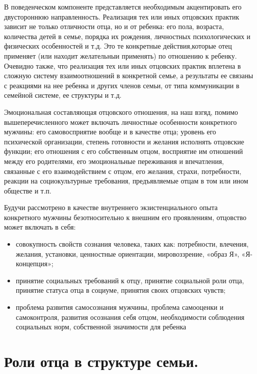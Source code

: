 \documentclass{../../common/thesisbyxetex}
\begin{document}
В поведенческом компоненте
представляется необходимым акцентировать его двустороннюю направленность. Реализация тех или иных
отцовских практик зависит не только отличности отца, но и от ребенка: его пола, возраста, количества
детей в семье, порядка их рождения, личностных психологических и физических особенностей и т.д.
Это те конкретные действия,которые отец применяет (или находит желательныи
применять) по отношению к ребенку. Очевидно также, что реализация тех или иных отцовских практик
вплетена в
сложную систему взаимоотношений в конкретной семье, а результаты ее связаны с реакциями на
нее ребенка и других членов семьи, от типа коммуникации в семейной системе, ее структуры и т.д.

Эмоциональная составляющая отцовского отношения, на наш взгяд, помимо вышеперечисленного может
включать личностные особенности конкретного мужчины: его самовосприятие вообще и в качестве отца;
уровень его психической организации, степень готовности и желания исполнять отцовские функции;
его отношения с его собственным отцом, восприятие им отношений между его родителями, его
эмоциональные переживания и впечатления, связанные с его взаимодействием с отцом, его желания,
страхи, потребности, реакции на социокультурные требования, предъявляемые отцам в том или ином
обществе и т.п.

Будучи рассмотрено в качестве внутреннего экзистенциального опыта
конкретного мужчины безотносительно к внешним его проявлениям, отцовство может включать в себя:

\begin{itemize}
	\item  совокупность свойств сознания человека, таких
как: потребности, влечения, желания, установки, ценностные ориентации,
мировоззрение, «образ Я», «Я-концепция»;

\item принятие социальных требований к отцу, принятие социальной роли отца, принятие статуса отца в
социуме, принятия своих отцовских чувств;

\item проблема развития самосознания мужчины, проблема самооценки и самоконтроля, развития осознания
себя отцом, необходимости соблюдения социальных норм, собственной значимости для ребенка
\cite{psyot}
\end{itemize}



\section{Роли отца в структуре семьи.}
\end{document}
